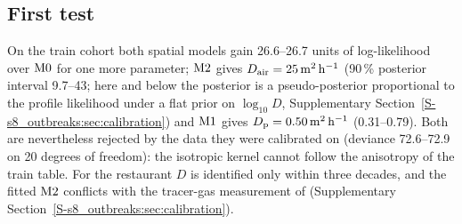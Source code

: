 \subsection{First test}\label{s8_outbreaks:sec:holdout}

On the train cohort both spatial models gain 26.6--26.7 units of log-likelihood over $\mathrm{M0}$ for one more
parameter; $\mathrm{M2}$ gives $D_{\mathrm{air}}=25\,\mathrm{m}^2\,\mathrm{h}^{-1}$ (90\,\% posterior interval 9.7--43; here and below the posterior is a
pseudo-posterior proportional to the profile likelihood under a flat prior on $\log_{10}D$, Supplementary
Section~\ref{S-s8_outbreaks:sec:calibration}) and $\mathrm{M1}$ gives $D_{\mathrm{p}}=0.50\,\mathrm{m}^2\,\mathrm{h}^{-1}$
(0.31--0.79). Both are nevertheless rejected by the data they were calibrated on (deviance 72.6--72.9 on 20
degrees of freedom): the isotropic kernel cannot follow the anisotropy of the train table. For the restaurant
$D$ is identified only within three decades, and the fitted $\mathrm{M2}$ conflicts with the tracer-gas measurement of
\citet{li2021} (Supplementary Section~\ref{S-s8_outbreaks:sec:calibration}).

